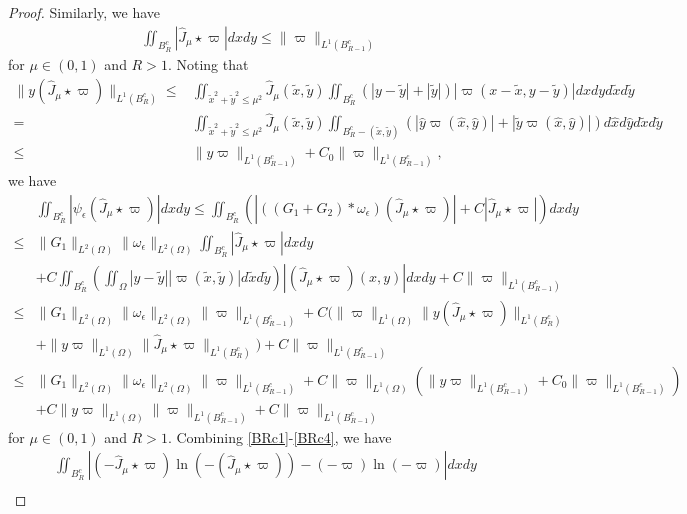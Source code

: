 \documentclass[1 [leqno, 11pt]{amsart}
\numberwithin{equation}{section}
\let\ep=\epsilon
\begin{document}
\begin{CJK*}{GBK}{song}
\begin{appendix}
\begin{proof}
Similarly, we have
\begin{align}\label{BRc3}
\iint_{B_R^c}|\hat J_{\mu}\star\varpi|dxdy\leq \|\varpi\|_{L^1(B_{R-1}^c)}
\end{align}  for $\mu\in(0,1)$ and $R>1$.
Noting that
\begin{align*}
\|y(\hat J_{\mu}\star\varpi)\|_{L^1(B_R^c)}\leq &\iint_{\tilde x^2+\tilde y^2\leq \mu^2}\hat J_{\mu}(\tilde x,\tilde y)\iint_{B_R^c}\left(|y-\tilde y|+|\tilde y|\right)|\varpi(x-\tilde x,y-\tilde y)|dxdyd\tilde xd\tilde y\\
= &\iint_{\tilde x^2+\tilde y^2\leq \mu^2}\hat J_{\mu}(\tilde x,\tilde y)\iint_{B_R^c-(\tilde x,\tilde y)}\left(|\hat y\varpi(\hat x,\hat y)|+|\tilde y\varpi(\hat x,\hat y)|\right)d\hat xd\hat yd\tilde xd\tilde y\\
\leq& \|y\varpi\|_{L^1(B_{R-1}^c)}+C_0\|\varpi\|_{L^1(B_{R-1}^c)},
\end{align*}
we have
\begin{align}\nonumber
&\iint_{B_R^c}|\psi_\ep(\hat J_{\mu}\star\varpi)|dxdy\leq\iint_{B_R^c}\left(|((G_1+G_2)*\omega_\ep)(\hat J_{\mu}\star\varpi)|+C|\hat J_{\mu}\star\varpi|\right)dxdy\\\nonumber
\leq&\|G_1\|_{L^2(\Omega)} \|\omega_\ep\|_{L^2(\Omega)} \iint_{B_R^c}|\hat J_{\mu}\star\varpi|dxdy\\\nonumber
&+C\iint_{B_R^c}\left(\iint_\Omega|y-\tilde y||\varpi(\tilde x,\tilde y)|d\tilde x d\tilde y\right)|(\hat J_{\mu}\star\varpi)(x,y)|dxdy+C\|\varpi\|_{L^1(B_{R-1}^c)}\\\nonumber
\leq &\|G_1\|_{L^2(\Omega)} \|\omega_\ep\|_{L^2(\Omega)}\|\varpi\|_{L^1(B_{R-1}^c)}+C(\|\varpi\|_{L^1(\Omega)}\|y(\hat J_{\mu}\star\varpi)\|_{L^1(B_R^c)}\\\nonumber
&+\|y\varpi\|_{L^1(\Omega)}\|\hat J_{\mu}\star\varpi\|_{L^1(B_R^c)})+C\|\varpi\|_{L^1(B_{R-1}^c)}\\\nonumber
\leq &\|G_1\|_{L^2(\Omega)} \|\omega_\ep\|_{L^2(\Omega)}\|\varpi\|_{L^1(B_{R-1}^c)}+C\|\varpi\|_{L^1(\Omega)}(\|y\varpi\|_{L^1(B_{R-1}^c)}+C_0\|\varpi\|_{L^1(B_{R-1}^c)})\\\label{BRc4}
&+C\|y\varpi\|_{L^1(\Omega)}\|\varpi\|_{L^1(B_{R-1}^c)}+C\|\varpi\|_{L^1(B_{R-1}^c)}
\end{align}
for $\mu\in(0,1)$ and $R>1$. Combining \eqref{BRc1}-\eqref{BRc4}, we have
\begin{align}\nonumber
&\iint_{B_R^c}|(-\hat J_{\mu}\star\varpi)\ln(-(\hat J_{\mu}\star\varpi))-(-\varpi)\ln(-\varpi)|dxdy\\\nonumber

\end{align}
\end{proof}
\end{appendix}
\end{CJK*}
\end{document}
